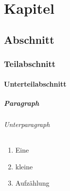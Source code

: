 
\chapter{Kapitel}
\section{Abschnitt}
\subsection{Teilabschnitt}
\subsubsection{Unterteilabschnitt}
\paragraph{Paragraph}
\subparagraph{Unterparagraph}

\begin{enumerate}
     \item Eine
     \item kleine
     \item Aufzählung
\end{enumerate}

